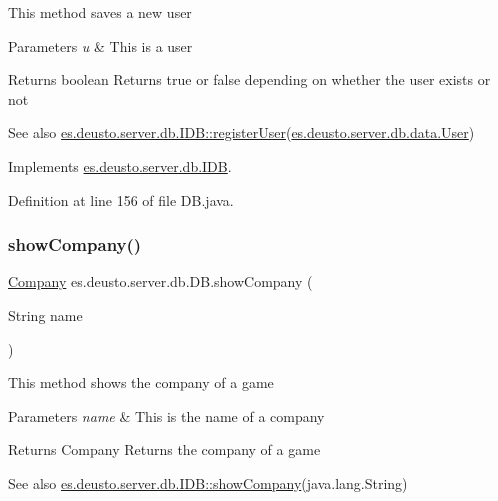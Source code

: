 This method saves a new user 
\begin{DoxyParams}{Parameters}
{\em u} & This is a user \\
\hline
\end{DoxyParams}
\begin{DoxyReturn}{Returns}
boolean Returns true or false depending on whether the user exists or not 
\end{DoxyReturn}
\begin{DoxySeeAlso}{See also}
\hyperlink{interfacees_1_1deusto_1_1server_1_1db_1_1_i_d_b_ad9ecf628cb97ade7cb1b10fd1b3a18c4}{es.\+deusto.\+server.\+db.\+I\+D\+B\+::register\+User}(\hyperlink{classes_1_1deusto_1_1server_1_1db_1_1data_1_1_user}{es.\+deusto.\+server.\+db.\+data.\+User}) 
\end{DoxySeeAlso}


Implements \hyperlink{interfacees_1_1deusto_1_1server_1_1db_1_1_i_d_b_ad9ecf628cb97ade7cb1b10fd1b3a18c4}{es.\+deusto.\+server.\+db.\+I\+DB}.



Definition at line 156 of file D\+B.\+java.

\mbox{\label{classes_1_1deusto_1_1server_1_1db_1_1_d_b_ab5edf3ae158bb0501a882b1d724cc2a8}} 
\subsubsection{\texorpdfstring{show\+Company()}{showCompany()}}
{\footnotesize\ttfamily \hyperlink{classes_1_1deusto_1_1server_1_1db_1_1data_1_1_company}{Company} es.\+deusto.\+server.\+db.\+D\+B.\+show\+Company (\begin{DoxyParamCaption}\item[{String}]{name }\end{DoxyParamCaption})}

This method shows the company of a game 
\begin{DoxyParams}{Parameters}
{\em name} & This is the name of a company \\
\hline
\end{DoxyParams}
\begin{DoxyReturn}{Returns}
Company Returns the company of a game 
\end{DoxyReturn}
\begin{DoxySeeAlso}{See also}
\hyperlink{interfacees_1_1deusto_1_1server_1_1db_1_1_i_d_b_a1681e29b5fbe4377b19e67fa939b2782}{es.\+deusto.\+server.\+db.\+I\+D\+B\+::show\+Company}(java.\+lang.\+String) 
\end{DoxySeeAlso}


